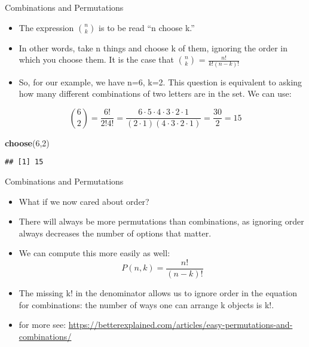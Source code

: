 \documentclass[
  ignorenonframetext,
]{beamer}
\newenvironment{Shaded}{\begin{snugshade}}{\end{snugshade}}
\newcommand{\DecValTok}[1]{\textcolor[rgb]{0.00,0.00,0.81}{#1}}
\newcommand{\KeywordTok}[1]{\textcolor[rgb]{0.13,0.29,0.53}{\textbf{#1}}}
\newcommand{\NormalTok}[1]{#1}
\begin{document}
\begin{frame}[fragile]{Combinations and Permutations}
\protect\hypertarget{combinations-and-permutations-1}{}

\begin{itemize}
\item
  The expression \(\binom{n}{k}\) is to be read ``n choose k.''
\item
  In other words, take n things and choose k of them, ignoring the order
  in which you choose them. It is the case that \(\binom{n}{k}\) =
  \(\frac{n!}{k!(n-k)!}\)
\item
  So, for our example, we have n=6, k=2. This question is equivalent to
  asking how many different combinations of two letters are in the set.
  We can use:
\end{itemize}

\[\binom{6}{2} = \frac{6!}{2!4!} = \frac{6·5·4·3·2·1}{(2·1)(4·3·2·1)} = \frac{30}{2} = 15\]

\begin{Shaded}
\begin{Highlighting}[]
\KeywordTok{choose}\NormalTok{(}\DecValTok{6}\NormalTok{,}\DecValTok{2}\NormalTok{)}
\end{Highlighting}
\end{Shaded}

\begin{verbatim}
## [1] 15
\end{verbatim}

\end{frame}

\begin{frame}{Combinations and Permutations}
\protect\hypertarget{combinations-and-permutations-2}{}

\begin{itemize}
\item
  What if we now cared about order?
\item
  There will always be more permutations than combinations, as ignoring
  order always decreases the number of options that matter.
\item
  We can compute this more easily as well:
  \[P(n, k) = \frac{n!}{(n-k)!}\]
\item
  The missing k! in the denominator allows us to ignore order in the
  equation for combinations: the number of ways one can arrange k
  objects is k!.
\item
  for more see:
  \url{https://betterexplained.com/articles/easy-permutations-and-combinations/}
\end{itemize}

\end{frame}
\end{document}
